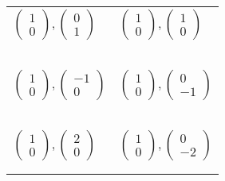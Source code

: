 \documentclass[fontsize=20pt]{scrartcl}
\begin{document}
\begin{tabular}{p{13cm}p{13cm}}
$\begin{pmatrix}1\\0\end{pmatrix}, \begin{pmatrix}0\\1\end{pmatrix}$
&$\begin{pmatrix}1\\0\end{pmatrix}, \begin{pmatrix}1\\0\end{pmatrix}$
\\\\\\
\\\\\\

$\begin{pmatrix}1\\0\end{pmatrix}, \begin{pmatrix}-1\\0\end{pmatrix}$
&$\begin{pmatrix}1\\0\end{pmatrix}, \begin{pmatrix}0\\-1\end{pmatrix}$
\\\\\\
\\\\\\

$\begin{pmatrix}1\\0\end{pmatrix}, \begin{pmatrix}2\\0\end{pmatrix}$
&$\begin{pmatrix}1\\0\end{pmatrix}, \begin{pmatrix}0\\-2\end{pmatrix}$
\\\\\\
\end{tabular}
\end{document}

